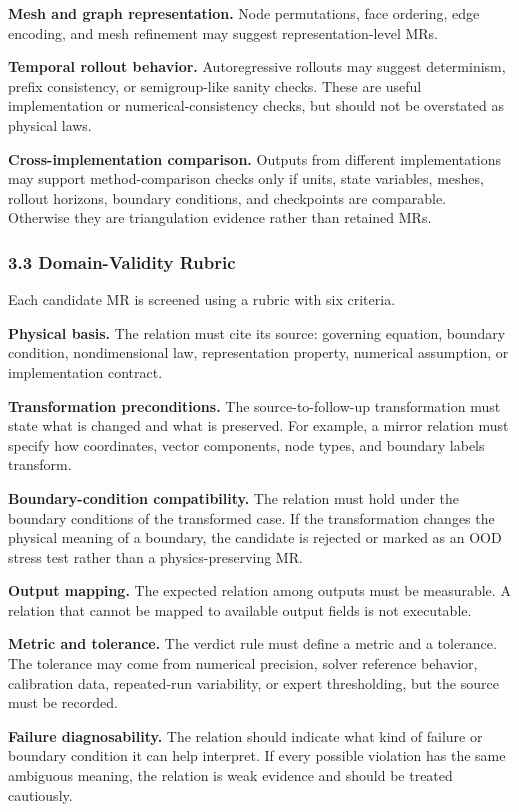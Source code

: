\textbf{Mesh and graph representation.} Node permutations, face
ordering, edge encoding, and mesh refinement may suggest
representation-level MRs.

\textbf{Temporal rollout behavior.} Autoregressive rollouts may suggest
determinism, prefix consistency, or semigroup-like sanity checks. These
are useful implementation or numerical-consistency checks, but should
not be overstated as physical laws.

\textbf{Cross-implementation comparison.} Outputs from different
implementations may support method-comparison checks only if units,
state variables, meshes, rollout horizons, boundary conditions, and
checkpoints are comparable. Otherwise they are triangulation evidence
rather than retained MRs.

\subsubsection{3.3 Domain-Validity Rubric}\label{domain-validity-rubric}

Each candidate MR is screened using a rubric with six criteria.

\textbf{Physical basis.} The relation must cite its source: governing
equation, boundary condition, nondimensional law, representation
property, numerical assumption, or implementation contract.

\textbf{Transformation preconditions.} The source-to-follow-up
transformation must state what is changed and what is preserved. For
example, a mirror relation must specify how coordinates, vector
components, node types, and boundary labels transform.

\textbf{Boundary-condition compatibility.} The relation must hold under
the boundary conditions of the transformed case. If the transformation
changes the physical meaning of a boundary, the candidate is rejected or
marked as an OOD stress test rather than a physics-preserving MR.

\textbf{Output mapping.} The expected relation among outputs must be
measurable. A relation that cannot be mapped to available output fields
is not executable.

\textbf{Metric and tolerance.} The verdict rule must define a metric and
a tolerance. The tolerance may come from numerical precision, solver
reference behavior, calibration data, repeated-run variability, or
expert thresholding, but the source must be recorded.

\textbf{Failure diagnosability.} The relation should indicate what kind
of failure or boundary condition it can help interpret. If every
possible violation has the same ambiguous meaning, the relation is weak
evidence and should be treated cautiously.

